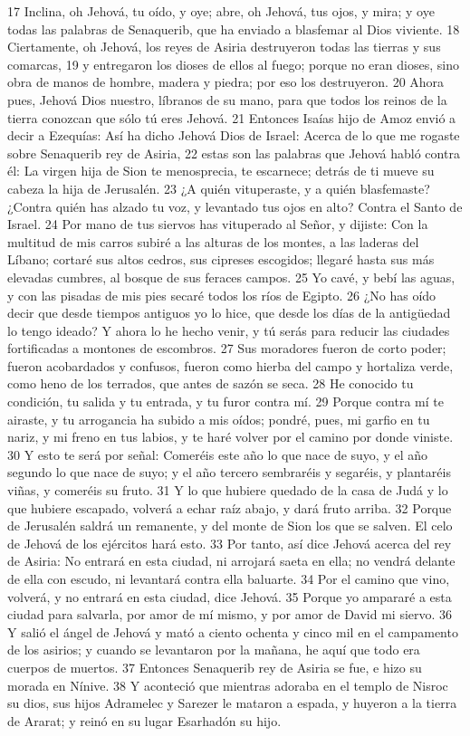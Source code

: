 17 Inclina, oh Jehová, tu oído, y oye; abre, oh Jehová, tus ojos, y mira; y oye todas las palabras de Senaquerib, que ha enviado a blasfemar al Dios viviente.
18 Ciertamente, oh Jehová, los reyes de Asiria destruyeron todas las tierras y sus comarcas,
19 y entregaron los dioses de ellos al fuego; porque no eran dioses, sino obra de manos de hombre, madera y piedra; por eso los destruyeron. 
20 Ahora pues, Jehová Dios nuestro, líbranos de su mano, para que todos los reinos de la tierra conozcan que sólo tú eres Jehová.
21 Entonces Isaías hijo de Amoz envió a decir a Ezequías: Así ha dicho Jehová Dios de Israel: Acerca de lo que me rogaste sobre Senaquerib rey de Asiria,
22 estas son las palabras que Jehová habló contra él: La virgen hija de Sion te menosprecia, te escarnece; detrás de ti mueve su cabeza la hija de Jerusalén.
23 ¿A quién vituperaste, y a quién blasfemaste? ¿Contra quién has alzado tu voz, y levantado tus ojos en alto? Contra el Santo de Israel.
24 Por mano de tus siervos has vituperado al Señor, y dijiste: Con la multitud de mis carros subiré a las alturas de los montes, a las laderas del Líbano; cortaré sus altos cedros, sus cipreses escogidos; llegaré hasta sus más elevadas cumbres, al bosque de sus feraces campos.
25 Yo cavé, y bebí las aguas, y con las pisadas de mis pies secaré todos los ríos de Egipto.
26 ¿No has oído decir que desde tiempos antiguos yo lo hice, que desde los días de la antigüedad lo tengo ideado? Y ahora lo he hecho venir, y tú serás para reducir las ciudades fortificadas a montones de escombros.
27 Sus moradores fueron de corto poder; fueron acobardados y confusos, fueron como hierba del campo y hortaliza verde, como heno de los terrados, que antes de sazón se seca.
28 He conocido tu condición, tu salida y tu entrada, y tu furor contra mí.
29 Porque contra mí te airaste, y tu arrogancia ha subido a mis oídos; pondré, pues, mi garfio en tu nariz, y mi freno en tus labios, y te haré volver por el camino por donde viniste.
30 Y esto te será por señal: Comeréis este año lo que nace de suyo, y el año segundo lo que nace de suyo; y el año tercero sembraréis y segaréis, y plantaréis viñas, y comeréis su fruto.
31 Y lo que hubiere quedado de la casa de Judá y lo que hubiere escapado, volverá a echar raíz abajo, y dará fruto arriba.
32 Porque de Jerusalén saldrá un remanente, y del monte de Sion los que se salven. El celo de Jehová de los ejércitos hará esto.
33 Por tanto, así dice Jehová acerca del rey de Asiria: No entrará en esta ciudad, ni arrojará saeta en ella; no vendrá delante de ella con escudo, ni levantará contra ella baluarte.
34 Por el camino que vino, volverá, y no entrará en esta ciudad, dice Jehová.
35 Porque yo ampararé a esta ciudad para salvarla, por amor de mí mismo, y por amor de David mi siervo.
36 Y salió el ángel de Jehová y mató a ciento ochenta y cinco mil en el campamento de los asirios; y cuando se levantaron por la mañana, he aquí que todo era cuerpos de muertos.
37 Entonces Senaquerib rey de Asiria se fue, e hizo su morada en Nínive.
38 Y aconteció que mientras adoraba en el templo de Nisroc su dios, sus hijos Adramelec y Sarezer le mataron a espada, y huyeron a la tierra de Ararat; y reinó en su lugar Esarhadón su hijo. 

